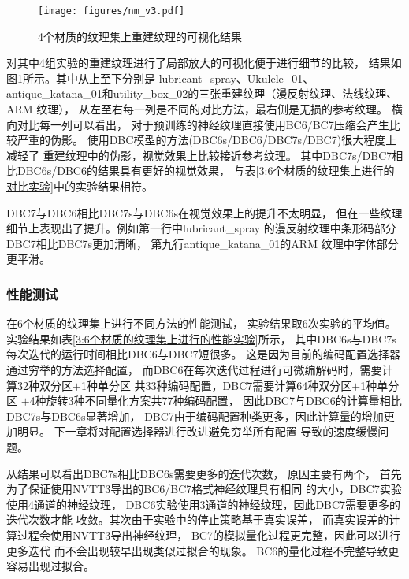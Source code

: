 \begin{figure}[htbp]
    \centering
    \texttt{[image: figures/nm\_v3.pdf]}
    \caption{4个材质的纹理集上重建纹理的可视化结果}
    \label{fig:nm_v3}
\end{figure}

对其中4组实验的重建纹理进行了局部放大的可视化便于进行细节的比较，
结果如图\ref{fig:nm_v3}所示。其中从上至下分别是
lubricant\_spray、Ukulele\_01、
antique\_katana\_01和utility\_box\_02的三张重建纹理（漫反射纹理、法线纹理、ARM 纹理），
从左至右每一列是不同的对比方法，最右侧是无损的参考纹理。
横向对比每一列可以看出，
对于预训练的神经纹理直接使用BC6/BC7压缩会产生比较严重的伪影。
使用DBC模型的方法(DBC6s/DBC6/DBC7s/DBC7)很大程度上减轻了
重建纹理中的伪影，视觉效果上比较接近参考纹理。
其中DBC7s/DBC7相比DBC6s/DBC6的结果具有更好的视觉效果，
与表\ref{3:6个材质的纹理集上进行的对比实验}中的实验结果相符。

DBC7与DBC6相比DBC7s与DBC6s在视觉效果上的提升不太明显，
但在一些纹理细节上表现出了提升。例如第一行中lubricant\_spray
的漫反射纹理中条形码部分DBC7相比DBC7s更加清晰，
第九行antique\_katana\_01的ARM 纹理中字体部分
更平滑。


\subsubsection{性能测试}
\label{3:性能测试}
在6个材质的纹理集上进行不同方法的性能测试，
实验结果取6次实验的平均值。
实验结果如表\ref{3:6个材质的纹理集上进行的性能实验}所示，
其中DBC6s与DBC7s每次迭代的运行时间相比DBC6与DBC7短很多。
这是因为目前的编码配置选择器通过穷举的方法选择配置，
而DBC6在每次迭代过程进行可微编解码时，需要计算32种双分区$+$1种单分区
共33种编码配置，DBC7需要计算64种双分区$+$1种单分区
$+$4种旋转\times3种不同量化方案共77种编码配置，
因此DBC7与DBC6的计算量相比DBC7s与DBC6s显著增加，
DBC7由于编码配置种类更多，因此计算量的增加更加明显。
下一章将对配置选择器进行改进避免穷举所有配置
导致的速度缓慢问题。

从结果可以看出DBC7s相比DBC6s需要更多的迭代次数，
原因主要有两个，
首先为了保证使用NVTT3导出的BC6/BC7格式神经纹理具有相同
的大小，DBC7实验使用4通道的神经纹理，
DBC6实验使用3通道的神经纹理，因此DBC7需要更多的迭代次数才能
收敛。其次由于实验中的停止策略基于真实误差，
而真实误差的计算过程会使用NVTT3导出神经纹理，
BC7的模拟量化过程更完整，因此可以进行更多迭代
而不会出现较早出现类似过拟合的现象。
BC6的量化过程不完整导致更容易出现过拟合。

